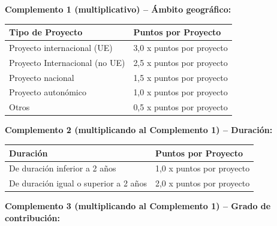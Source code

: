 \documentclass{article}
\begin{document}
\begin{itemize}
\begin{itemize}
\begin{scriptsize}
                  \textbf{Complemento 1 (multiplicativo) – Ámbito geográfico:}

                  \vspace{0.4cm}
                  \begin{table}[h!]\centering\renewcommand{\arraystretch}{1.3}
                    \begin{tabular}{|p{}|p{}|}\hline
                      Tipo de Proyecto               & Puntos por Proyecto       \\\hline
                      Proyecto internacional (UE)    & 3,0 x puntos por proyecto \\\hline
                      Proyecto Internacional (no UE) & 2,5 x puntos por proyecto \\\hline
                      Proyecto nacional              & 1,5 x puntos por proyecto \\\hline
                      Proyecto autonómico            & 1,0 x puntos por proyecto \\\hline
                      Otros                          & 0,5 x puntos por proyecto \\\hline
                    \end{tabular}\end{table}
                  \vspace{0.4cm}

                  \textbf{Complemento 2 (multiplicando al Complemento 1) – Duración:}

                  \vspace{0.4cm}
                  \begin{table}[h!]\centering\renewcommand{\arraystretch}{1.3}
                    \begin{tabular}{|p{}|p{}|}\hline
                      Duración                              & Puntos por Proyecto       \\\hline
                      De duración inferior a 2 años         & 1,0 x puntos por proyecto \\\hline
                      De duración igual o superior a 2 años & 2,0 x puntos por proyecto \\\hline
                    \end{tabular}\end{table}
                  \vspace{0.4cm}

                  \textbf{Complemento 3 (multiplicando al Complemento 1) – Grado de contribución:}


\end{scriptsize}
\end{itemize}
\end{itemize}
\end{document}
